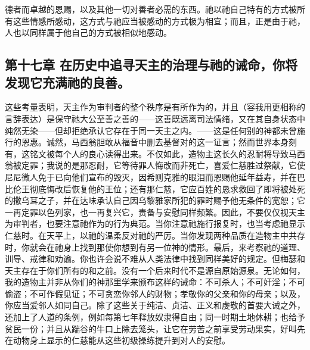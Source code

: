 德者而卓越的恩赐，以及其他一切对善者必需的东西。祂以祂自己特有的方式被所有这些情感所感动，这方式与祂应当被感动的方式极为相宜；而且，正是由于祂，人也以同样属于他自己的方式被相似地感动。\par


\subsection{第十七章 在历史中追寻天主的治理与祂的诫命，你将发现它充满祂的良善。}

这些考量表明，天主作为审判者的整个秩序是有所作为的，并且（容我用更相称的言辞表达）是保守祂大公至善之善的——这善既远离司法情绪，又在其自身状态中纯然无染——但却拒绝承认它存在于同一天主之内。——这是任何别的神都未曾施行的恩惠。诚然，马西翁胆敢从福音中删去基督对的这一证言；然而世界本身刻有，这铭文被每个人的良心读得出来。不仅如此，造物主这长久的忍耐将导致马西翁被定罪；我说的是那忍耐，它等待罪人悔改而非死亡，喜爱仁慈胜过祭献，它使尼尼微人免于已向他们宣布的毁灭，因希则克雅的眼泪而恩赐他延年益寿，并在巴比伦王彻底悔改后恢复他的王位；还有那仁慈，它应百姓的恳求救回了即将被处死的撒乌耳之子，并在达味承认自己因乌黎雅家所犯的罪时赐予他无条件的宽恕；它一再定罪以色列家，也一再复兴它，责备与安慰同样频繁。因此，不要仅仅视天主为审判者，也要注意祂作为的行为典范。当你注意祂施行报复时，也当考虑祂显示仁慈时。在天平上，以祂的温柔反对祂的严厉。当你发现两种品质在造物主中共存时，你就会在祂身上找到那使你想到有另一位神的情形。最后，来考察祂的道理、训导、戒律和劝谕。你也许会说不难从人类法律中找到同样美好的规定。但梅瑟和天主存在于你们所有的和之前。没有一个后来时代不是源自原始源泉。无论如何，我的造物主并非从你们的神那里学来颁布这样的诫命：不可杀人；不可奸淫；不可偷盗；不可作假见证；不可贪恋你邻人的财物；孝敬你的父亲和你的母亲；以及，你应当爱邻人如同自己。除了这些关于纯洁、贞洁、正义和虔敬的首要大诫之外，还加上了人道的条例，例如每第七年释放奴隶得自由；同一时期土地休耕；也给予贫民一份；并且从踹谷的牛口上除去笼头，让它在劳苦之前享受劳动果实，好叫先在动物身上显示的仁慈能从这些初级操练提升到对人的安慰。\par

